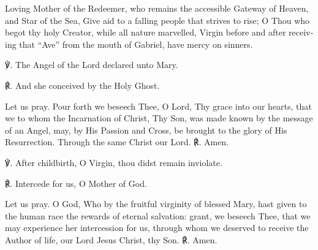 \begin{otherlanguage}{english}\noindent Loving Mother of the Redeemer, 
who remains the accessible Gateway of Heaven,
and Star of the Sea,
Give aid to a falling people 
that strives to rise;
O Thou who begot thy holy Creator,
while all nature marvelled,
Virgin before and after
receiving that ``Ave'' from the mouth of Gabriel,
have mercy on sinners.


\noindent ℣. The Angel of the Lord declared unto Mary.

\noindent ℟. And she conceived by the Holy Ghost.

\noindent Let us pray. Pour forth we beseech Thee, O Lord, Thy grace into our hearts, that we to whom the Incarnation of Christ, Thy Son, was made known by the message of an Angel, may, by His Passion and Cross, be brought to the glory of His Resurrection. Through the same Christ our Lord. ℟. Amen.


\noindent ℣. After childbirth, O Virgin, thou didst remain inviolate.

\noindent ℟. Intercede for us, O Mother of God.

\noindent Let us pray. O God, Who by the fruitful virginity of blessed Mary, hast given to the human race the rewards of eternal salvation: grant, we beseech Thee, that we may experience her intercession for us, through whom we deserved to receive the Author of life, our Lord Jesus Christ, thy Son. ℟. Amen.
\end{otherlanguage}
